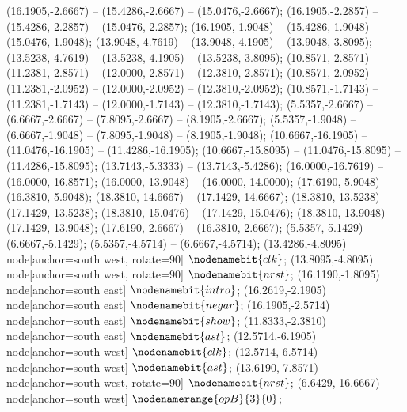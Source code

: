    (16.1905,-2.6667) -- (15.4286,-2.6667) -- (15.0476,-2.6667);
   (16.1905,-2.2857) -- (15.4286,-2.2857) -- (15.0476,-2.2857);
   (16.1905,-1.9048) -- (15.4286,-1.9048) -- (15.0476,-1.9048);
   (13.9048,-4.7619) -- (13.9048,-4.1905) -- (13.9048,-3.8095);
   (13.5238,-4.7619) -- (13.5238,-4.1905) -- (13.5238,-3.8095);
   (10.8571,-2.8571) -- (11.2381,-2.8571) -- (12.0000,-2.8571) -- (12.3810,-2.8571);
   (10.8571,-2.0952) -- (11.2381,-2.0952) -- (12.0000,-2.0952) -- (12.3810,-2.0952);
   (10.8571,-1.7143) -- (11.2381,-1.7143) -- (12.0000,-1.7143) -- (12.3810,-1.7143);
   (5.5357,-2.6667) -- (6.6667,-2.6667) -- (7.8095,-2.6667) -- (8.1905,-2.6667);
   (5.5357,-1.9048) -- (6.6667,-1.9048) -- (7.8095,-1.9048) -- (8.1905,-1.9048);
   (10.6667,-16.1905) -- (11.0476,-16.1905) -- (11.4286,-16.1905);
   (10.6667,-15.8095) -- (11.0476,-15.8095) -- (11.4286,-15.8095);
   (13.7143,-5.3333) -- (13.7143,-5.4286);
   (16.0000,-16.7619) -- (16.0000,-16.8571);
   (16.0000,-13.9048) -- (16.0000,-14.0000);
   (17.6190,-5.9048) -- (16.3810,-5.9048);
   (18.3810,-14.6667) -- (17.1429,-14.6667);
   (18.3810,-13.5238) -- (17.1429,-13.5238);
   (18.3810,-15.0476) -- (17.1429,-15.0476);
   (18.3810,-13.9048) -- (17.1429,-13.9048);
   (17.6190,-2.6667) -- (16.3810,-2.6667);
   (5.5357,-5.1429) -- (6.6667,-5.1429);
   (5.5357,-4.5714) -- (6.6667,-4.5714);
   (13.4286,-4.8095) node[anchor=south west, rotate=90] {$\nodenamebit{clk}$};
   (13.8095,-4.8095) node[anchor=south west, rotate=90] {$\nodenamebit{nrst}$};
   (16.1190,-1.8095) node[anchor=south east] {$\nodenamebit{intro}$};
   (16.2619,-2.1905) node[anchor=south east] {$\nodenamebit{negar}$};
   (16.1905,-2.5714) node[anchor=south east] {$\nodenamebit{show}$};
   (11.8333,-2.3810) node[anchor=south east] {$\nodenamebit{ast}$};
   (12.5714,-6.1905) node[anchor=south west] {$\nodenamebit{clk}$};
   (12.5714,-6.5714) node[anchor=south west] {$\nodenamebit{ast}$};
   (13.6190,-7.8571) node[anchor=south west, rotate=90] {$\nodenamebit{nrst}$};
   (6.6429,-16.6667) node[anchor=south west] {$\nodenamerange{opB}{3}{0}$};
